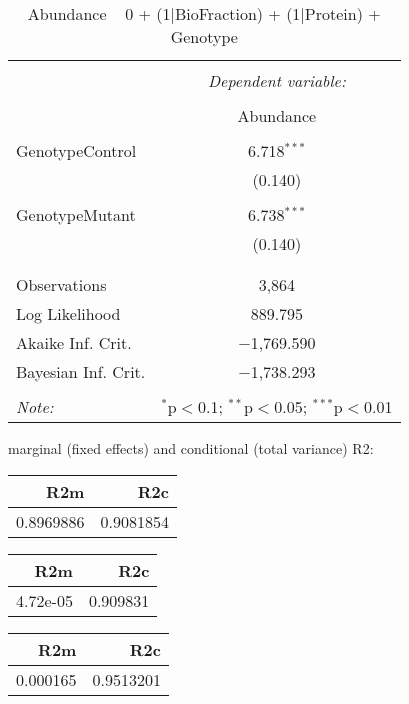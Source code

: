 \documentclass[11pt]{report}
\begin{document}
\begin{table}[!htbp] \centering 
  \caption{Abundance ~ 0 + (1|BioFraction) + (1|Protein) + Genotype} 
  \label{} 
\begin{tabular}{@{\extracolsep{5pt}}lc} 
\\[-1.8ex]\hline 
\hline \\[-1.8ex] 
 & \multicolumn{1}{c}{\textit{Dependent variable:}} \\ 
\cline{2-2} 
\\[-1.8ex] & Abundance \\ 
\hline \\[-1.8ex] 
 GenotypeControl & 6.718$^{***}$ \\ 
  & (0.140) \\ 
  & \\ 
 GenotypeMutant & 6.738$^{***}$ \\ 
  & (0.140) \\ 
  & \\ 
\hline \\[-1.8ex] 
Observations & 3,864 \\ 
Log Likelihood & 889.795 \\ 
Akaike Inf. Crit. & $-$1,769.590 \\ 
Bayesian Inf. Crit. & $-$1,738.293 \\ 
\hline 
\hline \\[-1.8ex] 
\textit{Note:}  & \multicolumn{1}{r}{$^{*}$p$<$0.1; $^{**}$p$<$0.05; $^{***}$p$<$0.01} \\ 
\end{tabular} 
\end{table} 
marginal (fixed effects) and conditional (total variance) R2:

\begin{tabular}{r|r}
\hline
R2m & R2c\\
\hline
0.8969886 & 0.9081854\\
\hline
\end{tabular}

\begin{tabular}{r|r}
\hline
R2m & R2c\\
\hline
4.72e-05 & 0.909831\\
\hline
\end{tabular}

\begin{tabular}{r|r}
\hline
R2m & R2c\\
\hline
0.000165 & 0.9513201\\
\hline
\end{tabular}
\end{document}
